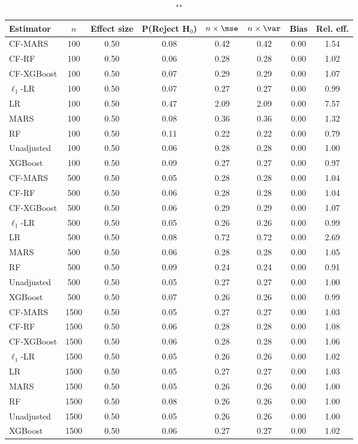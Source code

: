 \begin{table}
\centering
\caption{""}
\begin{tabular}{lccccccc}
\toprule
Estimator & $n$ & Effect size & P(Reject H$_0$) & $n\times\mse$ & $n\times \var$ & Bias & Rel. eff.\\ \midrule
CF-MARS & 100 & 0.50 & 0.08 & 0.42 & 0.42 & 0.00 & 1.54 \\ 
CF-RF & 100 & 0.50 & 0.06 & 0.28 & 0.28 & 0.00 & 1.02 \\ 
CF-XGBoost & 100 & 0.50 & 0.07 & 0.29 & 0.29 & 0.00 & 1.07 \\ 
$\ell_1$-LR & 100 & 0.50 & 0.07 & 0.27 & 0.27 & 0.00 & 0.99 \\ 
LR & 100 & 0.50 & 0.47 & 2.09 & 2.09 & 0.00 & 7.57 \\ 
MARS & 100 & 0.50 & 0.08 & 0.36 & 0.36 & 0.00 & 1.32 \\ 
RF & 100 & 0.50 & 0.11 & 0.22 & 0.22 & 0.00 & 0.79 \\ 
Unadjusted & 100 & 0.50 & 0.06 & 0.28 & 0.28 & 0.00 & 1.00 \\ 
XGBoost & 100 & 0.50 & 0.09 & 0.27 & 0.27 & 0.00 & 0.97 \\ \addlinespace 
CF-MARS & 500 & 0.50 & 0.05 & 0.28 & 0.28 & 0.00 & 1.04 \\ 
CF-RF & 500 & 0.50 & 0.06 & 0.28 & 0.28 & 0.00 & 1.04 \\ 
CF-XGBoost & 500 & 0.50 & 0.06 & 0.29 & 0.29 & 0.00 & 1.07 \\ 
$\ell_1$-LR & 500 & 0.50 & 0.05 & 0.26 & 0.26 & 0.00 & 0.99 \\ 
LR & 500 & 0.50 & 0.08 & 0.72 & 0.72 & 0.00 & 2.69 \\ 
MARS & 500 & 0.50 & 0.06 & 0.28 & 0.28 & 0.00 & 1.05 \\ 
RF & 500 & 0.50 & 0.09 & 0.24 & 0.24 & 0.00 & 0.91 \\ 
Unadjusted & 500 & 0.50 & 0.05 & 0.27 & 0.27 & 0.00 & 1.00 \\ 
XGBoost & 500 & 0.50 & 0.07 & 0.26 & 0.26 & 0.00 & 0.99 \\ \addlinespace 
CF-MARS & 1500 & 0.50 & 0.05 & 0.27 & 0.27 & 0.00 & 1.03 \\ 
CF-RF & 1500 & 0.50 & 0.06 & 0.28 & 0.28 & 0.00 & 1.08 \\ 
CF-XGBoost & 1500 & 0.50 & 0.06 & 0.28 & 0.28 & 0.00 & 1.06 \\ 
$\ell_1$-LR & 1500 & 0.50 & 0.05 & 0.26 & 0.26 & 0.00 & 1.02 \\ 
LR & 1500 & 0.50 & 0.05 & 0.27 & 0.27 & 0.00 & 1.03 \\ 
MARS & 1500 & 0.50 & 0.05 & 0.26 & 0.26 & 0.00 & 1.00 \\ 
RF & 1500 & 0.50 & 0.08 & 0.26 & 0.26 & 0.00 & 1.00 \\ 
Unadjusted & 1500 & 0.50 & 0.05 & 0.26 & 0.26 & 0.00 & 1.00 \\ 
XGBoost & 1500 & 0.50 & 0.06 & 0.27 & 0.27 & 0.00 & 1.02 \\
\bottomrule
\end{tabular}
\end{table}
